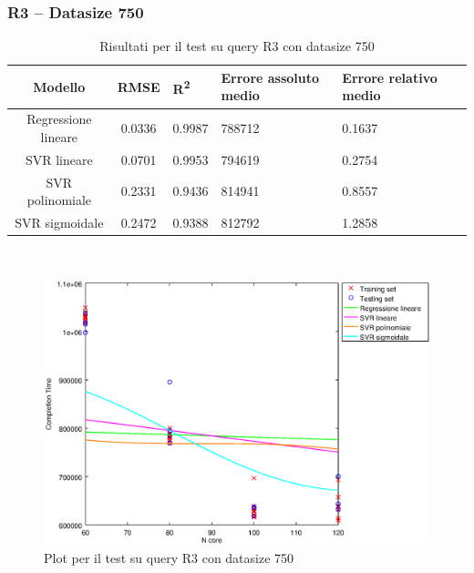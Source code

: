 \documentclass[a4paper,11pt]{article}
\begin{document}
\subsubsection{R3 -- Datasize 750}
\begin{table}[bhpt]
	\centering
	\begin{adjustbox}{center}
		\begin{tabular}{c | c M{1.2cm} M{2.5cm} M{2.5cm} M{1.8cm}}
			Modello & RMSE & R\textsuperscript{2} & Errore assoluto medio & Errore relativo medio \tabularnewline
			\hline
			Regressione lineare & 0.0336 & 0.9987 & 788712 & 0.1637 \\
			SVR lineare & 0.0701 & 0.9953 & 794619 & 0.2754 \\
			SVR polinomiale & 0.2331 & 0.9436 & 814941 & 0.8557 \\
			SVR sigmoidale & 0.2472 & 0.9388 & 812792 & 1.2858 \\
		\end{tabular}
	\end{adjustbox}
	\\
	\caption{Risultati per il test su query R3 con datasize 750}
	\label{table_R3_750}
\end{table}

\begin {figure}[hbtp]
\centering
\includegraphics[width=\textwidth]{output/R3_750/plot_R3_750.eps}
\caption {Plot per il test su query R3 con datasize 750}
\end {figure}
\newpage
\end{document}
